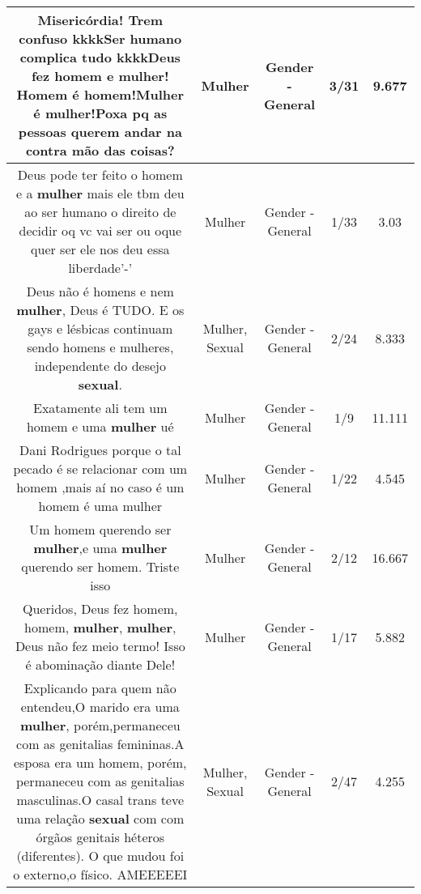 \documentclass[11pt]{article}
\newlength\mylength
\begin{document}
\begin{center}
\begin{longtable}{|C{.65\mylength}|C{.30\mylength}|C{.12\mylength}|C{.12\mylength}|C{.12\mylength}|}
  \small Misericórdia! Trem confuso kkkkSer humano complica tudo kkkkDeus fez homem e \textbf{mulher}! Homem é homem!\textbf{Mulher} é \textbf{mulher}!Poxa pq as pessoas querem andar na contra mão das coisas?\normalsize   & Mulher & Gender - General & 3/31 & 9.677 \\  \hline
  \small Deus pode ter feito o homem e a \textbf{mulher} mais ele tbm deu ao ser humano o direito de decidir oq vc vai ser ou oque quer ser ele nos deu essa liberdade'-'\normalsize   & Mulher & Gender - General & 1/33 & 3.03 \\  \hline
  \small Deus não é homens e nem \textbf{mulher}, Deus é TUDO. E os gays e lésbicas continuam sendo homens e mulheres, independente do desejo \textbf{sexual}.\normalsize   & Mulher, Sexual & Gender - General & 2/24 & 8.333 \\  \hline
  \small Exatamente ali tem um homem e uma \textbf{mulher} ué\normalsize   & Mulher & Gender - General & 1/9 & 11.111 \\  \hline
  \small Dani Rodrigues porque o tal pecado é se relacionar com um homem ,mais aí no caso é um homem é uma mulher\normalsize   & Mulher & Gender - General & 1/22 & 4.545 \\  \hline
  \small Um homem querendo ser \textbf{mulher},e uma \textbf{mulher} querendo ser homem. Triste isso\normalsize   & Mulher & Gender - General & 2/12 & 16.667 \\  \hline
  \small Queridos, Deus fez homem, homem, \textbf{mulher}, \textbf{mulher}, Deus não fez meio termo! Isso é abominação diante Dele!\normalsize   & Mulher & Gender - General & 1/17 & 5.882 \\  \hline
  \small Explicando para quem não entendeu,O marido era uma \textbf{mulher}, porém,permaneceu com as genitalias femininas.A esposa era um homem, porém, permaneceu com as genitalias masculinas.O casal trans teve uma relação \textbf{sexual} com com órgãos genitais héteros (diferentes). O que mudou foi o externo,o físico.  AMEEEEEI\normalsize   & Mulher, Sexual & Gender - General & 2/47 & 4.255 \\  \hline

\end{longtable}
\end{center}
\end{document}
